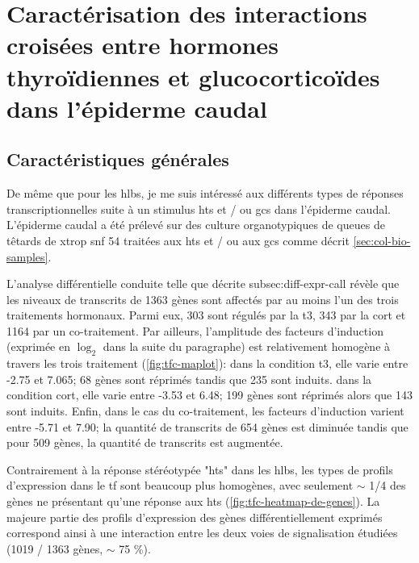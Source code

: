 \documentclass[../main.tex]{subfiles}
\begin{document}
\chapter{Caractérisation des interactions croisées entre hormones thyroïdiennes et glucocorticoïdes dans l'épiderme caudal}


\section{Caractéristiques générales}

De même que pour les \glspl{hlb}, je me suis intéressé aux différents types de réponses transcriptionnelles suite à un stimulus \glspl{ht} et / ou \glspl{gc} dans l'épiderme caudal.
L'épiderme caudal a été prélevé sur des culture organotypiques de queues de têtards de \gls{xtrop} \gls{snf} 54 traitées aux \glspl{ht} et / ou aux \glspl{gc} comme décrit \autoref{sec:col-bio-samples}.

L'analyse différentielle conduite telle que décrite subsec:diff-expr-call révèle que les niveaux de transcrits de 1363 gènes sont affectés par au moins l'un des trois traitements hormonaux.
Parmi eux, 303 sont régulés par la \gls{t3}, 343 par la \gls{cort} et 1164 par un co-traitement.
Par ailleurs, l'amplitude des facteurs d'induction (exprimée en $\log_2$ dans la suite du paragraphe) est relativement homogène à travers les trois traitement (\autoref{fig:tfc-maplot}):
dans la condition \gls{t3}, elle varie entre -2.75 et 7.065; 68 gènes sont réprimés tandis que 235 sont induits.
dans la condition \gls{cort}, elle varie entre -3.53 et 6.48; 199 gènes sont réprimés alors que 143 sont induits.
Enfin, dans le cas du co-traitement, les facteurs d'induction varient entre -5.71 et 7.90; la quantité de transcrits de 654 gènes est diminuée tandis que pour 509 gènes, la quantité de transcrits est augmentée.



Contrairement à la réponse stéréotypée "\glspl{ht}" dans les \glspl{hlb}, les types de profils d'expression dans le \gls{tf} sont beaucoup plus homogènes, avec seulement $\sim$ 1/4 des gènes ne présentant qu'une réponse aux \glspl{ht} (\autoref{fig:tfc-heatmap-de-genes}).
La majeure partie des profils d'expression des gènes différentiellement exprimés correspond ainsi à une interaction entre les deux voies de signalisation étudiées (1019 / 1363 gènes, $\sim$ 75 \%).


\end{document}

